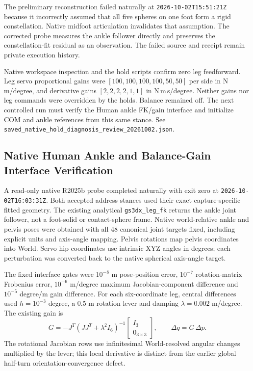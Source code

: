 \documentclass[11pt,a4paper]{article}
\begin{document}
The preliminary reconstruction failed naturally at
\texttt{2026-10-02T15:51:21Z} because it incorrectly assumed that all five
spheres on one foot form a rigid constellation. Native midfoot articulation
invalidates that assumption. The corrected probe measures the ankle
follower directly and preserves the constellation-fit residual as an
observation. The failed source and receipt remain private execution history.

Native workspace inspection and the hold scripts confirm zero leg
feedforward. Leg servo proportional gains were
$[100,100,100,100,50,50]$ per side in N\,m/degree, and derivative gains
$[2,2,2,2,1,1]$ in N\,m\,s/degree. Neither gains nor leg commands were
overridden by the holds. Balance remained off. The next controlled run
must verify the Human ankle FK/gain interface and initialize COM and ankle
references from this same stance. See
\texttt{saved\_native\_hold\_diagnosis\_review\_20261002.json}.


\subsection{Native Human Ankle and Balance-Gain Interface Verification}
A read-only native R2025b probe completed naturally with exit zero at
\texttt{2026-10-02T16:03:31Z}. Both accepted address stances used their exact
capture-specific fitted geometry. The existing analytical
\texttt{gs3dx\_leg\_fk} returns the ankle joint follower, not a foot-solid
or contact-sphere frame. Native world-relative ankle and pelvis poses
were obtained with all 48 canonical joint targets fixed, including explicit
units and axis-angle mapping. Pelvis rotations map pelvis coordinates into
World. Servo hip coordinates use intrinsic XYZ angles in degrees; each
perturbation was converted back to the native spherical axis-angle target.

The fixed interface gates were $10^{-8}$ m pose-position error,
$10^{-7}$ rotation-matrix Frobenius error, $10^{-6}$ m/degree maximum
Jacobian-component difference and $10^{-5}$ degree/m gain difference.
For each six-coordinate leg, central differences used
$h=10^{-3}$ degree, a 0.5 m rotation lever and damping
$\lambda=0.002$ m/degree. The existing gain is
\[
 G=-J^T(JJ^T+\lambda^2 I_6)^{-1}
 \begin{bmatrix}I_3\\0_{3\times3}\end{bmatrix},
 \qquad \Delta q=G\,\Delta p.
\]
The rotational Jacobian rows use infinitesimal World-resolved angular
changes multiplied by the lever; this local derivative is distinct from
the earlier global half-turn orientation-convergence defect.
\end{document}
